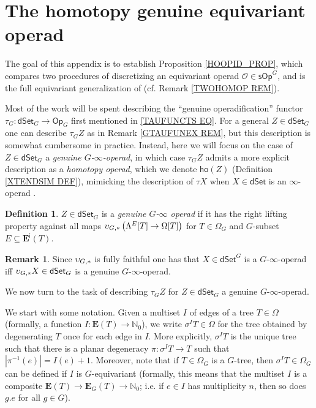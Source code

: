 \documentclass[a4paper,10pt]{article}%
\numberwithin{equation}{section}
\numberwithin{figure}{section}
\theoremstyle{definition} %
\newtheorem{definition}[equation]{Definition}%
\newtheorem{remark}[equation]{Remark}%
\renewcommand{\O}{\ensuremath{\mathcal O}}
\newcommand{\1}{\ensuremath{\mathbbm 1}}%
\begin{document}
\section{The homotopy genuine equivariant operad}
\label{HGEO AP}



The goal of this appendix is to establish
Proposition \ref{HOOPID_PROP},
which compares two procedures of discretizing 
an equivariant operad $\O \in \mathsf{sOp}^G$,
and is the full equivariant generalization of
\cite[Prop. 4.8]{CM13b}
(cf. Remark \ref{TWOHOMOP REM}).

Most of the work will be spent 
describing the ``genuine operadification'' functor
$\tau_G \colon \mathsf{dSet}_G \to \mathsf{Op}_G$
first mentioned in
\eqref{TAUFUNCTS EQ}.
For a general $Z \in \mathsf{dSet}_G$
one can describe $\tau_G Z$
as in Remark \ref{GTAUFUNEX REM},
but this description is somewhat cumbersome in practice.
Instead, here we will focus on the case of
$Z \in \mathsf{dSet}_G$
a \emph{genuine $G$-$\infty$-operad}, 
in which case $\tau_G Z$
admits a more explicit description
as a \emph{homotopy operad},
which we denote
$\mathsf{ho} (Z)$ (Definition \ref{XTENDSIM DEF}),
mimicking the description
of $\tau X$ when $X\in \mathsf{dSet}$
is an $\infty$-operad \cite[\S 6]{MW09}.





\begin{definition}
$Z \in \mathsf{dSet}_G$
is a \emph{genuine $G$-$\infty$ operad}
if it has the right lifting property against all maps
$\upsilon_{G,\**} 
\left(\Lambda^E[T] \to \Omega[T]\right)$
for $T \in \Omega_G$
and $G$-subset
$E \subseteq \boldsymbol{E}^{\mathsf{i}}(T)$.
\end{definition}

\begin{remark}
	Since $\upsilon_{G,\**}$
	is fully faithful
	one has that 
	$X \in \mathsf{dSet}^G$
	is a $G$-$\infty$-operad
	iff
	$\upsilon_{G,\**}X \in \mathsf{dSet}_G$
	is a genuine $G$-$\infty$-operad.
\end{remark}



We now turn to the task of describing
$\tau_G Z$ for $Z \in \mathsf{dSet}_G$
a genuine $G$-$\infty$-operad.

We start with some notation. 
Given a multiset $I$ of edges of a tree $T \in \Omega$
(formally, a function 
$I \colon \boldsymbol{E}(T) \to \mathbb{N}_0$),
we write $\sigma^I T \in \Omega$
for the tree obtained by degenerating $T$ once for each edge in $I$.
More explicitly, $\sigma^I T$ is the unique tree such that there is a planar degeneracy
$\pi \colon \sigma^I T \to T$
such that $|\pi^{-1}(e)| = I(e) + 1$.
Moreover,
note that if $T\in \Omega_G$ is a $G$-tree, 
then $\sigma^{I} T \in \Omega_{G}$
can be defined if $I$ is $G$-equivariant
(formally, this means that the multiset $I$ is a composite
$\boldsymbol{E}(T) \to \boldsymbol{E}_G(T)
\to \mathbb{N}_0$;
i.e. if $e \in I$ has multiplicity $n$, then so does $ g.e$ for all $g \in G$).
\end{document}
